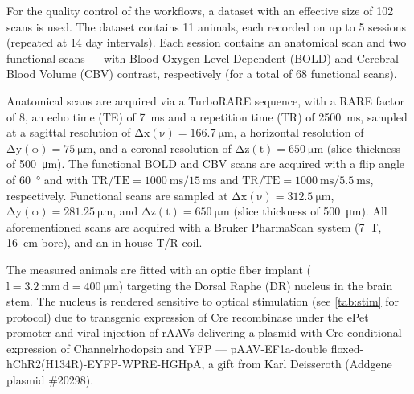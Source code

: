 For the quality control of the workflows, a dataset with an effective size of 102 scans is used.
The dataset contains 11 animals, each recorded on up to 5 sessions (repeated at 14 day intervals).
Each session contains an anatomical scan and two functional scans --- with Blood-Oxygen Level Dependent (BOLD) and Cerebral Blood Volume (CBV) contrast, respectively (for a total of 68 functional scans).

Anatomical scans are acquired via a TurboRARE sequence, with a RARE factor of 8, an echo time (TE) of \SI{7}{\milli\second} and a repetition time (TR) of \SI{2500}{\milli\second}, sampled at a sagittal resolution of $\mathrm{\Delta x(\nu)=\SI{166.7}{\micro\meter}}$, a horizontal resolution of $\mathrm{\Delta y(\phi)=\SI{75}{\micro\meter}}$, and a coronal resolution of $\mathrm{\Delta z(t)=\SI{650}{\micro\meter}}$ (slice thickness of \SI{500}{\micro\meter}).
The functional BOLD and CBV scans are acquired with a flip angle of \SI{60}{\degree} and with $\mathrm{TR/TE = \SI{1000}{\milli\second}/\SI{15}{\milli\second}}$ and $\mathrm{TR/TE = \SI{1000}{\milli\second}/\SI{5.5}{\milli\second}}$, respectively.
Functional scans are sampled at $\mathrm{\Delta x(\nu)=\SI{312.5}{\micro\meter}}$, $\mathrm{\Delta y(\phi)=\SI{281.25}{\micro\meter}}$, and $\mathrm{\Delta z(t)=\SI{650}{\micro\meter}}$ (slice thickness of \SI{500}{\micro\meter}).
All aforementioned scans are acquired with a Bruker PharmaScan system (\SI{7}{\tesla}, \SI{16}{\centi\meter} bore), and an in-house T/R coil.

The measured animals are fitted with an optic fiber implant ($\mathrm{l=\SI{3.2}{\milli\meter} \ d=\SI{400}{\micro\meter}}$) targeting the Dorsal Raphe (DR) nucleus in the brain stem.
The nucleus is rendered sensitive to optical stimulation (see \cref{tab:stim} for protocol) due to transgenic expression of Cre recombinase under the ePet promoter \cite{Scott2005} and viral injection of rAAVs delivering a plasmid with Cre-conditional expression of Channelrhodopsin and YFP ---
pAAV-EF1a-double floxed-hChR2(H134R)-EYFP-WPRE-HGHpA, a gift from Karl Deisseroth (Addgene plasmid \#20298).

